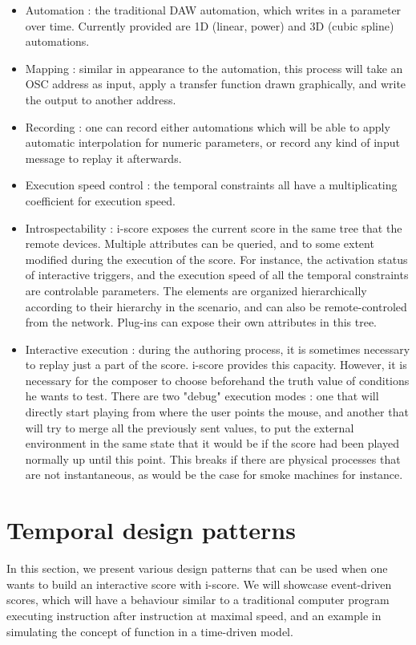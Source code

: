\documentclass{article}
\begin{document}
\begin{itemize}
\item Automation : the traditional DAW automation, which writes in a parameter over time. 
Currently provided are 1D (linear, power) and 3D (cubic spline) automations.
\item Mapping : similar in appearance to the automation, this process will take an OSC address as input, apply a transfer function drawn graphically, and write the output to another address.
\item Recording : one can record either automations which will be able to apply automatic interpolation for numeric parameters, or record any kind of input message to replay it afterwards.
\item Execution speed control : the temporal constraints all have a multiplicating coefficient for execution speed.
\item Introspectability : i-score exposes the current score in the same tree that the remote devices. 
Multiple attributes can be queried, and to some extent modified during the execution of the score. 
For instance, the activation status of interactive triggers, and the execution speed of all the temporal constraints are controlable parameters.
The elements are organized hierarchically according to their hierarchy in the scenario, and can also be remote-controled from the network.
Plug-ins can expose their own attributes in this tree.
\item Interactive execution : during the authoring process, it is sometimes necessary to replay just a part of the score.
i-score provides this capacity. 
However, it is necessary for the composer to choose beforehand the truth value of conditions he wants to test.
There are two "debug" execution modes : one that will directly start playing from where the user points the mouse, and another that will try to merge all the previously sent values, to put the external environment in the same state that it would be if the score had been played normally up until this point. 
This breaks if there are physical processes that are not instantaneous, as would be the case for smoke machines for instance.
\end{itemize}
\section{Temporal design patterns}
In this section, we present various design patterns that can be used 
when one wants to build an interactive score with i-score.
We will showcase event-driven scores, which will have a behaviour 
similar to a traditional computer program executing instruction after 
instruction at maximal speed, and an example in simulating the 
concept of function in a time-driven model.
\end{document}
